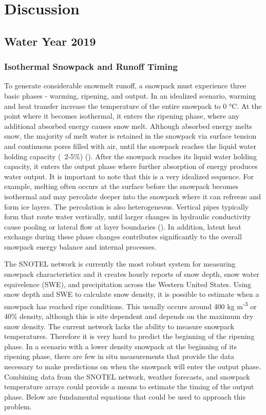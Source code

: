 \chapter{Discussion}
\section{Water Year 2019} 
\subsection{Isothermal Snowpack and Runoff Timing}
To generate considerable snowmelt runoff, a snowpack must experience three basic phases - warming, ripening, and output. In an idealized scenario, warming and heat transfer increase the temperature of the entire snowpack to 0 °C. At the point where it becomes isothermal, it enters the ripening phase, where any additional absorbed energy causes snow melt. Although absorbed energy melts snow, the majority of melt water is retained in the snowpack via surface tension and continuous pores filled with air, until the snowpack reaches the liquid water holding capacity (~2-5\%) (\cite{dingman2015}). After the snowpack reaches its liquid water holding capacity, it enters the output phase where further absorption of energy produces water output. It is important to note that this is a very idealized sequence. For example, melting often occurs at the surface before the snowpack becomes isothermal and may percolate deeper into the snowpack where it can refreeze and form ice layers. The percolation is also heterogeneous.  Vertical pipes typically form that route water vertically, until larger changes in hydraulic conductivity cause pooling or lateral flow at layer boundaries (\cite{evans2016isotopic, eiriksson2013evaluation}). In addition, latent heat exchange during these phase changes contributes significantly to the overall snowpack energy balance and internal processes. 

The SNOTEL network is currently the most robust system for measuring snowpack characteristics and it creates hourly reports of snow depth, snow water equivelence (SWE), and precipitation across the Western United States. Using snow depth and SWE to calculate snow density, it is possible to estimate when a snowpack has reached ripe conditions. This usually occurs around 400 kg m\textsuperscript{-3} or 40\% density, although this is site dependent and depends on the maximum dry snow density. The current network lacks the ability to measure snowpack temperatures. Therefore it is very hard to predict the beginning of the ripening phase. In a scenario with a lower density snowpack at the beginning of its ripening phase, there are few in situ measurements that provide the data necessary to make predictions on when the snowpack will enter the output phase. Combining data from the SNOTEL network, weather forecasts, and snowpack temperature arrays could provide a means to estimate the timing of the output phase. Below are fundamental equations that could be used to approach this problem. 

